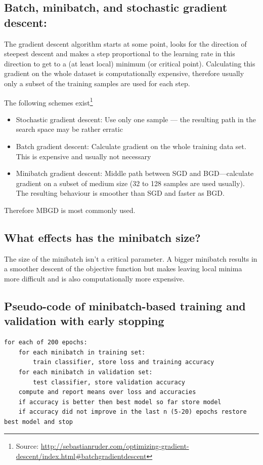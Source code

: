 \subsection{Batch, minibatch, and stochastic gradient descent:}
The gradient descent algorithm starts at some point, looks for the direction of steepest descent and makes a step proportional to the learning rate in this direction to get to a (at least local) minimum (or critical point). Calculating this gradient on the whole dataset is computationally expensive, therefore usually only a subset of the training samples are used for each step. 

The following schemes exist\footnote{Source: \url{http://sebastianruder.com/optimizing-gradient-descent/index.html\#batchgradientdescent}}
\begin{itemize}
\item Stochastic gradient descent: Use only one sample --- the resulting path in the search space may be rather erratic
\item Batch gradient descent: Calculate gradient on the whole training data set. This is expensive and usually not necessary
\item Minibatch gradient descent: Middle path between SGD and BGD---calculate gradient on a subset of medium size (32 to 128 samples are used usually). The resulting behaviour is smoother than SGD and faster as BGD. 
\end{itemize}

Therefore MBGD is most commonly used.
\subsection{What effects has the minibatch size?}
The size of the minibatch isn't a critical parameter. A bigger minibatch results in a smoother descent of the objective function but makes leaving local minima more difficult and is also computationally more expensive. 
\subsection{Pseudo-code of minibatch-based training and validation with early stopping}
\begin{lstlisting}
for each of 200 epochs:
    for each minibatch in training set:
        train classifier, store loss and training accuracy
    for each minibatch in validation set:
        test classifier, store validation accuracy
    compute and report means over loss and accuracies
    if accuracy is better then best model so far store model
    if accuracy did not improve in the last n (5-20) epochs restore best model and stop
\end{lstlisting}
%

